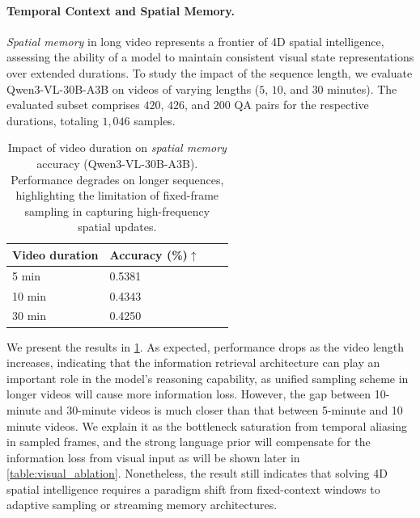 \paragraph{Temporal Context and Spatial Memory.}
\textit{Spatial memory} in long video represents a frontier of 4D spatial intelligence, assessing the ability of a model to maintain consistent visual state representations over extended durations.
To study the impact of the sequence length, we evaluate Qwen3-VL-30B-A3B on videos of varying lengths ($5$, $10$, and $30$ minutes).
The evaluated subset comprises $420$, $426$, and $200$ QA pairs for the respective durations, totaling $1,046$ samples.
\begin{table}
    \centering
    \begin{tabular}{llll}	 
    \toprule 
         \textbf{Video duration}     & \textbf{Accuracy (\%)$\uparrow$} \\         
         \midrule
         5 min     & 0.5381 \\
         10 min    & 0.4343 \\
         30 min    & 0.4250 \\   
    \bottomrule    
	\end{tabular}
    \caption{Impact of video duration on \textit{spatial memory} accuracy (Qwen3-VL-30B-A3B). Performance degrades on longer sequences, highlighting the limitation of fixed-frame sampling in capturing high-frequency spatial updates.}
    \label{table:spatial_memory_video_length}
\end{table}
We present the results in \cref{table:spatial_memory_video_length}.
As expected, performance drops as the video length increases, indicating that the information retrieval architecture can play an important role in the model's reasoning capability, as unified sampling scheme in longer videos will cause more information loss. However, the gap between 10-minute and 30-minute videos is much closer than that between 5-minute and 10 minute videos. We explain it as the bottleneck saturation from temporal aliasing in sampled frames, and the strong language prior will compensate for the information loss from visual input as will be shown later in \cref{table:visual_ablation}. Nonetheless, the result still indicates that solving 4D spatial intelligence requires a paradigm shift from fixed-context windows to adaptive sampling or streaming memory architectures.




